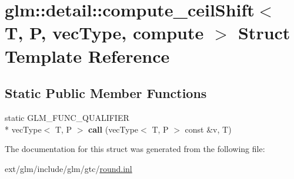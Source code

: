 \hypertarget{structglm_1_1detail_1_1compute__ceil_shift}{\section{glm\-:\-:detail\-:\-:compute\-\_\-ceil\-Shift$<$ T, P, vec\-Type, compute $>$ Struct Template Reference}
\label{structglm_1_1detail_1_1compute__ceil_shift}
}
\subsection*{Static Public Member Functions}
\begin{DoxyCompactItemize}
\item 
\hypertarget{structglm_1_1detail_1_1compute__ceil_shift_a5b16bf873601c2400f4914ad609df30d}{static G\-L\-M\-\_\-\-F\-U\-N\-C\-\_\-\-Q\-U\-A\-L\-I\-F\-I\-E\-R \\*
vec\-Type$<$ T, P $>$ {\bfseries call} (vec\-Type$<$ T, P $>$ const \&v, T)}\label{structglm_1_1detail_1_1compute__ceil_shift_a5b16bf873601c2400f4914ad609df30d}

\end{DoxyCompactItemize}


The documentation for this struct was generated from the following file\-:\begin{DoxyCompactItemize}
\item 
ext/glm/include/glm/gtc/\hyperlink{round_8inl}{round.\-inl}\end{DoxyCompactItemize}
